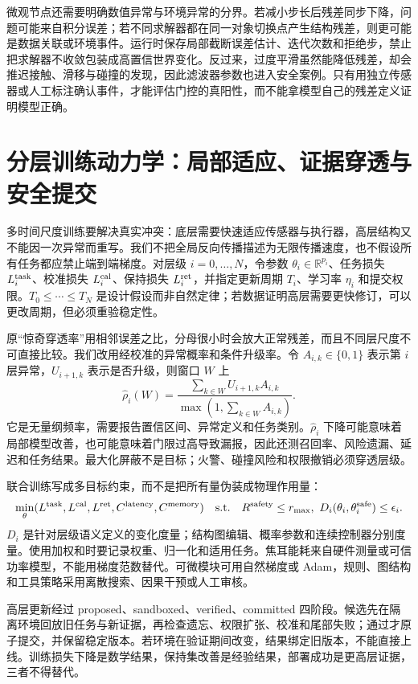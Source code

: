 微观节点还需要明确数值异常与环境异常的分界。若减小步长后残差同步下降，问题可能来自积分误差；若不同求解器都在同一对象切换点产生结构残差，则更可能是数据关联或环境事件。运行时保存局部截断误差估计、迭代次数和拒绝步，禁止把求解器不收敛包装成高置信世界变化。反过来，过度平滑虽然能降低残差，却会推迟接触、滑移与碰撞的发现，因此滤波器参数也进入安全案例。只有用独立传感器或人工标注确认事件，才能评估门控的真阳性，而不能拿模型自己的残差定义证明模型正确。

\section{分层训练动力学：局部适应、证据穿透与安全提交}
\label{sec:adiabatic_training_dynamics}

多时间尺度训练要解决真实冲突：底层需要快速适应传感器与执行器，高层结构又不能因一次异常而重写。我们不把全局反向传播描述为无限传播速度，也不假设所有任务都应禁止端到端梯度。对层级 $i=0,\ldots,N$，令参数 $\theta_i\in\mathbb R^{p_i}$、任务损失 $L_i^{\rm task}$、校准损失 $L_i^{\rm cal}$、保持损失 $L_i^{\rm ret}$，并指定更新周期 $T_i$、学习率 $\eta_i$ 和提交权限。$T_0\le\cdots\le T_N$ 是设计假设而非自然定律；若数据证明高层需要更快修订，可以更改周期，但必须重验稳定性。

原“惊奇穿透率”用相邻误差之比，分母很小时会放大正常残差，而且不同层尺度不可直接比较。我们改用经校准的异常概率和条件升级率。令 $A_{i,k}\in\{0,1\}$ 表示第 $i$ 层异常，$U_{i+1,k}$ 表示是否升级，则窗口 $W$ 上
\[
\widehat\rho_i(W)=\frac{\sum_{k\in W}U_{i+1,k}A_{i,k}}{\max(1,\sum_{k\in W}A_{i,k})}.
\]
它是无量纲频率，需要报告置信区间、异常定义和任务类别。$\widehat\rho_i$ 下降可能意味着局部模型改善，也可能意味着门限过高导致漏报，因此还测召回率、风险遗漏、延迟和任务结果。最大化屏蔽不是目标；火警、碰撞风险和权限撤销必须穿透层级。

联合训练写成多目标约束，而不是把所有量伪装成物理作用量：
\[
\min_{\theta}(L^{\rm task},L^{\rm cal},L^{\rm ret},C^{\rm latency},C^{\rm memory})
\quad\text{s.t.}\quad R^{\rm safety}\le r_{\max},\ D_i(\theta_i,\theta_i^{\rm safe})\le\epsilon_i.
\]
$D_i$ 是针对层级语义定义的变化度量；结构图编辑、概率参数和连续控制器分别度量。使用加权和时要记录权重、归一化和适用任务。焦耳能耗来自硬件测量或可信功率模型，不能用梯度范数替代。可微模块可用自然梯度或 Adam，规则、图结构和工具策略采用离散搜索、因果干预或人工审核。

高层更新经过 proposed、sandboxed、verified、committed 四阶段。候选先在隔离环境回放旧任务与新证据，再检查遗忘、权限扩张、校准和尾部失败；通过才原子提交，并保留稳定版本。若环境在验证期间改变，结果绑定旧版本，不能直接上线。训练损失下降是数学结果，保持集改善是经验结果，部署成功是更高层证据，三者不得替代。

